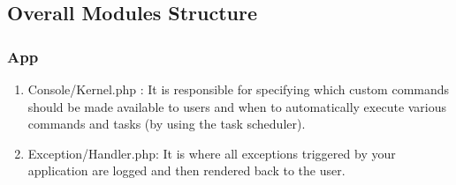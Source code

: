 \documentclass[letterpaper, 10 pt, conference]{ieeeconf}  %
\begin{document}
\subsection{Overall Modules Structure}

\subsubsection{App\\}
\begin{center}
\end{center}
\begin{enumerate}
\item Console/Kernel.php : It is responsible for specifying which custom commands should be made available to users and when to automatically execute various commands and tasks (by using the task scheduler).
\item Exception/Handler.php: It is where all exceptions triggered by your application are logged and then rendered back to the user. 
\end{enumerate}
\end{document}
